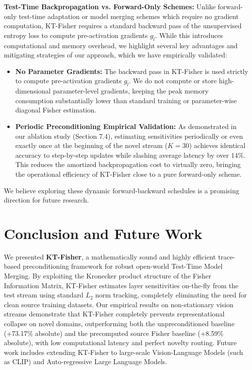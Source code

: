 \documentclass{article}
\theoremstyle{plain}
\theoremstyle{definition}
\theoremstyle{remark}
\begin{document}
\textbf{Test-Time Backpropagation vs. Forward-Only Schemes:}
Unlike forward-only test-time adaptation or model merging schemes which require no gradient computation, KT-Fisher requires a standard backward pass of the unsupervised entropy loss to compute pre-activation gradients $g_l$. While this introduces computational and memory overhead, we highlight several key advantages and mitigating strategies of our approach, which we have empirically validated:
\begin{itemize}
    \item \textbf{No Parameter Gradients:} The backward pass in KT-Fisher is used strictly to compute pre-activation gradients $g_l$. We do not compute or store high-dimensional parameter-level gradients, keeping the peak memory consumption substantially lower than standard training or parameter-wise diagonal Fisher estimation.
    \item \textbf{Periodic Preconditioning Empirical Validation:} As demonstrated in our ablation study (Section 7.4), estimating sensitivities periodically or even exactly once at the beginning of the novel stream (\(K=30\)) achieves identical accuracy to step-by-step updates while slashing average latency by over \(14\%\). This reduces the amortized backpropagation cost to virtually zero, bringing the operational efficiency of KT-Fisher close to a pure forward-only scheme.
\end{itemize}
We believe exploring these dynamic forward-backward schedules is a promising direction for future research.

\section{Conclusion and Future Work}
\label{conclusion}
We presented \textbf{KT-Fisher}, a mathematically sound and highly efficient trace-based preconditioning framework for robust open-world Test-Time Model Merging. By exploiting the Kronecker product structure of the Fisher Information Matrix, KT-Fisher estimates layer sensitivities on-the-fly from the test stream using standard $L_2$ norm tracking, completely eliminating the need for clean source training datasets. Our empirical results on non-stationary vision streams demonstrate that KT-Fisher completely prevents representational collapse on novel domains, outperforming both the unpreconditioned baseline (+73.17\% absolute) and the precomputed source Fisher baseline (+8.59\% absolute), with low computational latency and perfect novelty routing. Future work includes extending KT-Fisher to large-scale Vision-Language Models (such as CLIP) and Auto-regressive Large Language Models.

\clearpage



\end{document}
